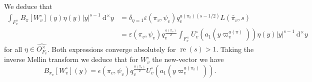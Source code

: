 \documentclass[a4paper,11pt]{amsart}
\theoremstyle{definition}
\newcommand{\real}{\operatorname{re}}
\begin{document}
We deduce that \begin{align*}\int_{F_v^{\times}}B_{\pi}[W^{\circ}_v](y)\eta(y) \vert{y}\vert^{s-1}\ \mathrm{d}^{\times}y &= \delta_{\eta=1}\varepsilon(\pi_v,\psi_v)q_v^{a(\pi_v)(s-1/2)}L(\tilde{\pi_v},s)\\ &=\varepsilon(\pi_v,\psi_v)q_v^{\frac{a(\pi_v)}{2}}\int_{F_v^{\times}}U^{\circ}_v(a_1(y\varpi_v^{a(\pi)}))\eta(y)\vert{y}\vert^{s-1}\ \mathrm{d}^{\times}y\end{align*}
for all $\eta \in \widehat{O_{F_v}^{\times}}$. Both expressions converge absolutely for $\real(s)>1$. Taking the inverse Mellin transform we deduce that for $W^{\circ}_v$ the new-vector we have \[B_{\pi_v}[W^{\circ}_v](y) = \epsilon(\pi_v,\psi_v)q_v^{\frac{a(\pi_v)}{2}}U^{\circ}_v(a_1(y\varpi_v^{a(\pi_v)})).\]



















\end{document}
